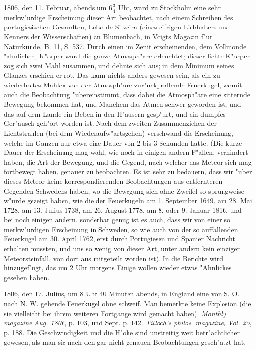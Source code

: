 \documentclass[a4paper, 11pt, oneside, polutonikogreek, german]{article}
\begin{document}
1806, den 11. Februar, abends um $\mathfrak{6\frac{3}{4}}$ Uhr, ward zu Stockholm eine sehr merkw"urdige Erscheinung dieser Art beobachtet, nach einem Schreiben des portugiesischen Gesandten, Lobo de Silveira (eines eifrigen Liebhabers und Kenners der Wissenschaften) an Blumenbach, in Voigts Magazin f"ur Naturkunde, B. 11, S. 537. Durch einen im Zenit erscheinenden, dem Vollmonde "ahnlichen, K"orper ward die ganze Atmosph"are erleuchtet; dieser lichte K"orper zog sich zwei Mahl zusammen, und dehnte sich aus; in dem Minimum seines Glanzes erschien er rot. Das kann nichts anders gewesen sein, als ein zu wiederholtes Mahlen von der Atmosph"are zur"uckprallende Feuerkugel, womit auch die Beobachtung "ubereinstimmt, dass dabei die Atmosph"are eine zitternde Bewegung bekommen hat, und Manchem das Atmen schwer geworden ist, und das auf dem Lande ein Beben in den H"ausern gesp"urt, und ein dumpfes Ger"ausch geh"ort worden ist. Nach dem zweiten Zusammenziehen der Lichtstrahlen (bei dem Wiederaufw"artsgehen) verschwand die Erscheinung, welche im Ganzen nur etwa eine Dauer von 2 bis 3 Sekunden hatte. (Die kurze Dauer der Erscheinung mag wohl, wie noch in einigen andern F"allen, verhindert haben, die Art der Bewegung, und die Gegend, nach welcher das Meteor sich mag fortbewegt haben, genauer zu beobachten. Es ist sehr zu bedauern, dass wir "uber dieses Meteor keine korrespondierenden Beobachtungen aus entfernteren Gegenden Schwedens haben, wo die Bewegung sich ohne Zweifel so sprungweise w"urde gezeigt haben, wie die der Feuerkugeln am 1. September 1649, am 28. Mai 1728, am 13. Julius 1738, am 26. August 1778, am 8. oder 9. Januar 1816, und bei noch einigen andern. sonderbar genug ist es auch, dass wir von einer so merkw"urdigen Erscheinung in Schweden, so wie auch von der so auffallenden Feuerkugel am 30. April 1762, erst durch Portugiesen und Spanier Nachricht erhalten mussten, und uns so wenig von dieser Art, unter andern kein einziger Meteorsteinfall, von dort aus mitgeteilt worden ist). In die Berichte wird hinzugef"ugt, das um 2 Uhr morgens Einige wollen wieder etwas "Ahnliches gesehen haben.

1806, den 17. Julius, um 8 Uhr 40 Minuten abends, in England eine von S. O. nach N. W. gehende Feuerkugel ohne schweif. Man bemerkte keine Explosion (die sie vielleicht bei ihrem weiteren Fortgange wird gemacht haben). \emph{Monthly magazine Aug. 1806}, p. 103, und Sept. p. 142. \emph{Tilloch's philos. magazine, Vol. 25}, p. 188. Die Geschwindigkeit und die H"ohe sind unstreitig weit betr"achtlicher gewesen, als man sie nach den gar nicht genauen Beobachtungen gesch"atzt hat.
\end{document}
